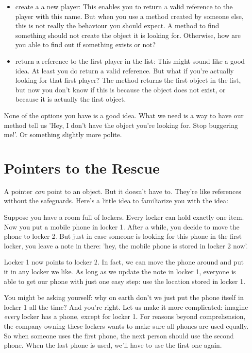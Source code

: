 \begin{itemize}
  \item create a a new player: This enables you to return a valid reference to the player with this name. But when you use a method created by someone else, this is not really the behaviour you should expect. A method to find something should not create the object it is looking for. Otherwise, how are you able to find out if something exists or not?
  \item return a reference to the first player in the list: This might sound like a good idea. At least you do return a valid reference. But what if you're actually looking for that first player? The method returns the first object in the list, but now you don't know if this is because the object does not exist, or because it is actually the first object.
\end{itemize}

None of the options you have is a good idea. What we need is a way to have our method tell us 'Hey, I don't have the object you're looking for. Stop buggering me!'. Or something slightly more polite.

\section{Pointers to the Rescue}

A pointer \textsl{can} point to an object. But it doesn't have to. They're like references without the safeguards. Here's a little idea to familiarize you with the idea:

Suppose you have a room full of lockers. Every locker can hold exactly one item. Now you put a mobile phone in locker 1. After a while, you decide to move the phone to locker 2. But just in case someone is looking for this phone in the first locker, you leave a note in there: 'hey, the mobile phone is stored in locker 2 now'.

Locker 1 now points to locker 2. In fact, we can move the phone around and put it in any locker we like. As long as we update the note in locker 1, everyone is able to get our phone with just one easy step: use the location stored in locker 1.

You might be asking yourself: why on earth don't we just put the phone itself in locker 1 all the time? And you're right. Let us make it more complicated: imagine \textsl{every} locker has a phone, except for locker 1. For reasons beyond comprehension, the company owning these lockers wants to make sure all phones are used equally. So when someone uses the first phone, the next person should use the second phone. When the last phone is used, we'll have to use the first one again.

